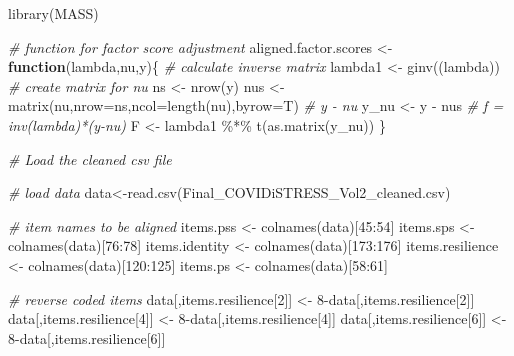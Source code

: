 \documentclass[
]{article}
\newenvironment{Shaded}{\begin{snugshade}}{\end{snugshade}}
\newcommand{\AttributeTok}[1]{\textcolor[rgb]{0.77,0.63,0.00}{#1}}
\newcommand{\CommentTok}[1]{\textcolor[rgb]{0.56,0.35,0.01}{\textit{#1}}}
\newcommand{\ControlFlowTok}[1]{\textcolor[rgb]{0.13,0.29,0.53}{\textbf{#1}}}
\newcommand{\DecValTok}[1]{\textcolor[rgb]{0.00,0.00,0.81}{#1}}
\newcommand{\FunctionTok}[1]{\textcolor[rgb]{0.00,0.00,0.00}{#1}}
\newcommand{\NormalTok}[1]{#1}
\newcommand{\OtherTok}[1]{\textcolor[rgb]{0.56,0.35,0.01}{#1}}
\newcommand{\SpecialCharTok}[1]{\textcolor[rgb]{0.00,0.00,0.00}{#1}}
\newcommand{\StringTok}[1]{\textcolor[rgb]{0.31,0.60,0.02}{#1}}
\begin{document}
\begin{Shaded}
\begin{Highlighting}[]
\FunctionTok{library}\NormalTok{(MASS)}

\CommentTok{\# function for factor score adjustment}
\NormalTok{aligned.factor.scores }\OtherTok{\textless{}{-}} \ControlFlowTok{function}\NormalTok{(lambda,nu,y)\{}
  \CommentTok{\# calculate inverse matrix}
\NormalTok{  lambda1 }\OtherTok{\textless{}{-}} \FunctionTok{ginv}\NormalTok{((lambda))}
  \CommentTok{\# create matrix for nu}
\NormalTok{  ns }\OtherTok{\textless{}{-}} \FunctionTok{nrow}\NormalTok{(y)}
\NormalTok{  nus }\OtherTok{\textless{}{-}} \FunctionTok{matrix}\NormalTok{(nu,}\AttributeTok{nrow=}\NormalTok{ns,}\AttributeTok{ncol=}\FunctionTok{length}\NormalTok{(nu),}\AttributeTok{byrow=}\NormalTok{T)}
  \CommentTok{\# y {-} nu}
\NormalTok{  y\_nu }\OtherTok{\textless{}{-}}\NormalTok{ y }\SpecialCharTok{{-}}\NormalTok{ nus}
  \CommentTok{\# f = inv(lambda)*(y{-}nu)}
\NormalTok{  F }\OtherTok{\textless{}{-}}\NormalTok{ lambda1 }\SpecialCharTok{\%*\%} \FunctionTok{t}\NormalTok{(}\FunctionTok{as.matrix}\NormalTok{(y\_nu))}
\NormalTok{\}}

\CommentTok{\# Load the cleaned csv file}

\CommentTok{\# load data}
\NormalTok{data}\OtherTok{\textless{}{-}}\FunctionTok{read.csv}\NormalTok{(}\StringTok{\textquotesingle{}Final\_COVIDiSTRESS\_Vol2\_cleaned.csv\textquotesingle{}}\NormalTok{)}

\CommentTok{\# item names to be aligned}
\NormalTok{items.pss }\OtherTok{\textless{}{-}} \FunctionTok{colnames}\NormalTok{(data)[}\DecValTok{45}\SpecialCharTok{:}\DecValTok{54}\NormalTok{]}
\NormalTok{items.sps }\OtherTok{\textless{}{-}} \FunctionTok{colnames}\NormalTok{(data)[}\DecValTok{76}\SpecialCharTok{:}\DecValTok{78}\NormalTok{]}
\NormalTok{items.identity }\OtherTok{\textless{}{-}} \FunctionTok{colnames}\NormalTok{(data)[}\DecValTok{173}\SpecialCharTok{:}\DecValTok{176}\NormalTok{]}
\NormalTok{items.resilience }\OtherTok{\textless{}{-}} \FunctionTok{colnames}\NormalTok{(data)[}\DecValTok{120}\SpecialCharTok{:}\DecValTok{125}\NormalTok{]}
\NormalTok{items.ps }\OtherTok{\textless{}{-}} \FunctionTok{colnames}\NormalTok{(data)[}\DecValTok{58}\SpecialCharTok{:}\DecValTok{61}\NormalTok{]}

\CommentTok{\# reverse coded items}
\NormalTok{data[,items.resilience[}\DecValTok{2}\NormalTok{]] }\OtherTok{\textless{}{-}} \DecValTok{8}\SpecialCharTok{{-}}\NormalTok{data[,items.resilience[}\DecValTok{2}\NormalTok{]]}
\NormalTok{data[,items.resilience[}\DecValTok{4}\NormalTok{]] }\OtherTok{\textless{}{-}} \DecValTok{8}\SpecialCharTok{{-}}\NormalTok{data[,items.resilience[}\DecValTok{4}\NormalTok{]]}
\NormalTok{data[,items.resilience[}\DecValTok{6}\NormalTok{]] }\OtherTok{\textless{}{-}} \DecValTok{8}\SpecialCharTok{{-}}\NormalTok{data[,items.resilience[}\DecValTok{6}\NormalTok{]]}


\end{Highlighting}
\end{Shaded}
\end{document}
